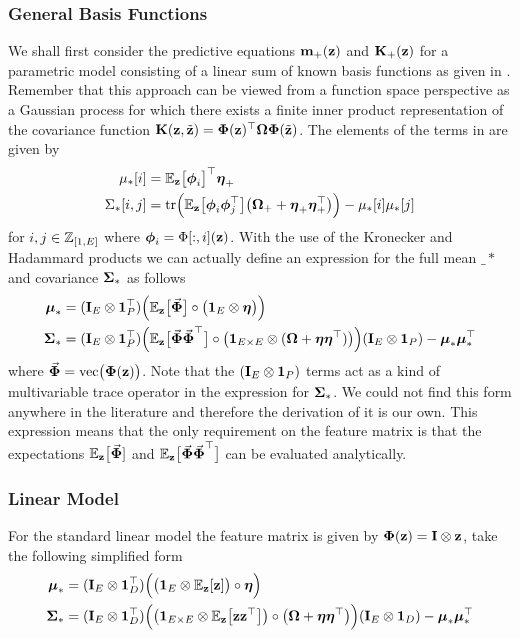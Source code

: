 \subsubsection{General Basis Functions}
We shall first consider the predictive equations $\mathbf{m}_+(\mathbf{z})$ and $\mathbf{K}_+(\mathbf{z})$ for a parametric model consisting of a linear sum of known basis functions as given in . Remember that this approach can be viewed from a function space perspective as a Gaussian process for which there exists a finite inner product representation of the covariance function $\mathbf{K}(\mathbf{z},\tilde{\mathbf{z}}) = \boldsymbol{\Phi}(\mathbf{z})^\top\boldsymbol{\Omega}\boldsymbol{\Phi}(\tilde{\mathbf{z}})$. 
%
The elements of the terms in  are given by 
\begin{align*}
\mu_{*}[i] &= 
\EE_{\bz}\big[\bph_{i}\big]\T \bet_{+} \\
%
\Sigma_{*}[i,j] &= 
\tr\Big(\EE_{\bz}\big[\bph_{i}\bph_{j}\T\big] \big(\bOm_{+}+\bet_+\bet_+\T\big) \Big) 
- \mu_{*}[i]\mu_{*}[j]
\end{align*}
for $i,j \in \mathbb{Z}_{[1,E]}$ where $\boldsymbol{\phi}_{i} = \Phi[:,i](\mathbf{z})$. 
%
With the use of the Kronecker and Hadammard products we can actually define an expression for the full mean $\bm_*$ and covariance $\boldsymbol{\Sigma}_*$ as follows
\begin{align}
\bm_* &= (\bI_E \otimes \mathbf{1}_P\T) \Big( \EE_{\bz}\big[\vec{\bPh}\big] \circ \big(\mathbf{1}_E \otimes \bet \big) \Big)
 \label{eqn:uncparamM}  \\
%
\bS_* &= 
 (\bI_E \otimes \mathbf{1}_P\T)
\Big( \EE_{\bz}\big[\vec{\bPh}\vec{\bPh}\T\big]  \circ 
\big(\mathbf{1}_{E\times E} \otimes (\bOm+\bet\bet\T) \big) \Big) 
 (\bI_E \otimes \mathbf{1}_P)
- \bm_*\bm_*\T
\label{eqn:uncparamV}
\end{align}
where $\vec{\boldsymbol{\Phi}} = \mathrm{vec}\big(\boldsymbol{\Phi}(\mathbf{z})\big)$. Note that the $(\mathbf{I}_E \otimes \mathbf{1}_P)$ terms act as a kind of multivariable trace operator in the expression for $\boldsymbol{\Sigma}_*$. We could not find this form anywhere in the literature and therefore the derivation of it is our own.
%
This expression means that the only requirement on the feature matrix is that the expectations $\mathbb{E}_{\mathbf{z}}\big[\vec{\boldsymbol{\Phi}}]$ and $\mathbb{E}_{\mathbf{z}}\big[\vec{\boldsymbol{\Phi}}\vec{\boldsymbol{\Phi}}^\top\big]$ can be evaluated analytically.





\subsubsection{Linear Model}
For the standard linear model the feature matrix is given by $\boldsymbol{\Phi}(\mathbf{z}) = \mathbf{I} \otimes \mathbf{z}$,  take the following simplified form
\begin{align}
\bm_* &= (\bI_E \otimes \mathbf{1}_D\T) \Big( \big( \mathbf{1}_E \otimes \EE_{\bz}[\bz] \big) \circ \bet \Big) 
\label{eqn:linMU} \\
%
\bS_* &= 
 (\bI_E \otimes \mathbf{1}_D\T)
\Big( \big(\mathbf{1}_{E\times E} \otimes \EE_{\bz}\big[\bz\bz\T\big] \big) \circ 
 \big(\bOm+\bet\bet\T\big) \Big) 
 (\bI_E \otimes \mathbf{1}_D)
- \bm_*\bm_*\T
\label{eqn:linSIG}
\end{align}








